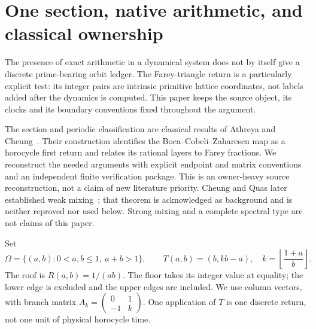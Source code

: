 \documentclass[10pt]{article}
\begin{document}

\section{One section, native arithmetic, and classical ownership}
The presence of exact arithmetic in a dynamical system does not by itself
give a discrete prime-bearing orbit ledger. The Farey-triangle return is
a particularly explicit test: its integer pairs are intrinsic primitive
lattice coordinates, not labels added after the dynamics is computed.
This paper keeps the source object, its clocks and its boundary conventions
fixed throughout the argument.

The section and periodic classification are classical results of
Athreya and Cheung~\cite{AC2014}. Their construction identifies the
Boca--Cobeli--Zaharescu map as a horocycle first return and relates its
rational layers to Farey fractions. We reconstruct the needed arguments
with explicit endpoint and matrix conventions and an independent finite
verification package. This is an owner-heavy source reconstruction, not
a claim of new literature priority. Cheung and Quas later established weak
mixing~\cite{CQ2024}; that theorem is acknowledged as background and is
neither reproved nor used below. Strong mixing and a complete spectral type
are not claims of this paper.

Set
\begin{equation}\label{eq:model}
\Omega=\{(a,b):0<a,b\leq1,\ a+b>1\},\qquad
T(a,b)=(b,kb-a),\quad k=\left\lfloor\frac{1+a}{b}\right\rfloor.
\end{equation}
The roof is $R(a,b)=1/(ab)$. The floor takes its integer value at equality;
the lower edge is excluded and the upper edges are included. We use column
vectors, with branch matrix
$A_k=\left(\begin{smallmatrix}0&1\\-1&k\end{smallmatrix}\right)$.
One application of $T$ is one discrete return, not one unit of physical
horocycle time.
\end{document}
